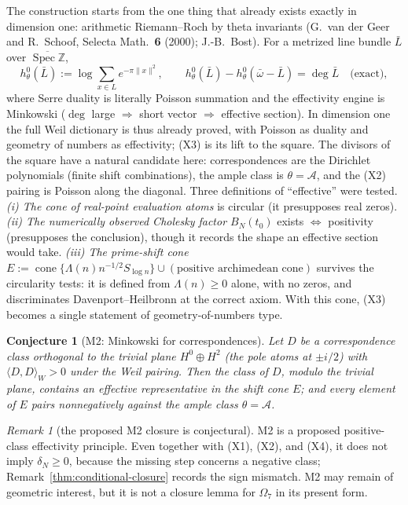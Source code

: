 \documentclass[11pt]{amsart}
\newtheorem{conjecture}[theorem]{Conjecture}
\theoremstyle{definition}
\theoremstyle{remark}
\newtheorem{remark}[theorem]{Remark}
\theoremstyle{definition}
\newcommand{\Z}{\mathbb{Z}}
\begin{document}
The construction starts from the one thing that already exists exactly in dimension one: arithmetic
Riemann--Roch by theta invariants (G.~van der Geer and R.~Schoof, Selecta Math.\ \textbf{6} (2000);
J.-B.~Bost).  For a metrized line bundle $\bar L$
over $\overline{\operatorname{Spec}\Z}$,
\[
   h^0_\theta(\bar L):=\log\sum_{x\in L}e^{-\pi\|x\|^2},\qquad
   h^0_\theta(\bar L)-h^0_\theta(\bar\omega-\bar L)=\deg\bar L\quad\text{(exact)},
\]
where Serre duality is literally Poisson summation and the effectivity engine is Minkowski ($\deg$ large
$\Rightarrow$ short vector $\Rightarrow$ effective section).  In dimension one the full Weil dictionary
is thus already proved, with Poisson as duality and geometry of numbers as effectivity; (X3) is its lift
to the square.  The divisors of the square have a natural candidate here: correspondences are the
Dirichlet polynomials (finite shift combinations), the ample class is $\theta=\mathcal A$, and the (X2)
pairing is Poisson along the diagonal.  Three definitions of ``effective'' were tested.  \emph{(i) The
cone of real-point evaluation atoms} is circular (it presupposes real zeros).  \emph{(ii) The numerically observed
Cholesky factor $B_N(t_0)$} exists $\iff$ positivity (presupposes the conclusion), though it records the
shape an effective section would take.  \emph{(iii) The prime-shift cone}
$E:=\operatorname{cone}\{\Lambda(n)n^{-1/2}S_{\log n}\}\cup(\text{positive archimedean cone})$ survives
the circularity tests: it is defined from $\Lambda(n)\ge0$ alone, with no zeros, and discriminates
Davenport--Heilbronn at the correct axiom.  With this cone, (X3) becomes a single statement of
geometry-of-numbers type.

\begin{conjecture}[M2: Minkowski for correspondences]\label{conj:M2}
Let $D$ be a correspondence class orthogonal to the trivial plane $H^0\oplus H^2$ (the pole atoms at
$\pm i/2$) with $\langle D,D\rangle_W>0$ under the Weil pairing.  Then the class of $D$, modulo the
trivial plane, contains an effective representative in the shift cone $E$; and every element of $E$
pairs nonnegatively against the ample class $\theta=\mathcal A$.
\end{conjecture}

\begin{remark}[the proposed M2 closure is conjectural]\label{thm:M2-closure}
\textnormal{M2} is a proposed positive-class effectivity principle.  Even together with
\textnormal{(X1)}, \textnormal{(X2)}, and \textnormal{(X4)}, it does not imply
$\delta_N\ge0$, because the missing step concerns a negative class;
Remark~\ref{thm:conditional-closure} records the sign mismatch.  M2 may remain of geometric interest,
but it is not a closure lemma for $\Omega_7$ in its present form.
\end{remark}
\end{document}
